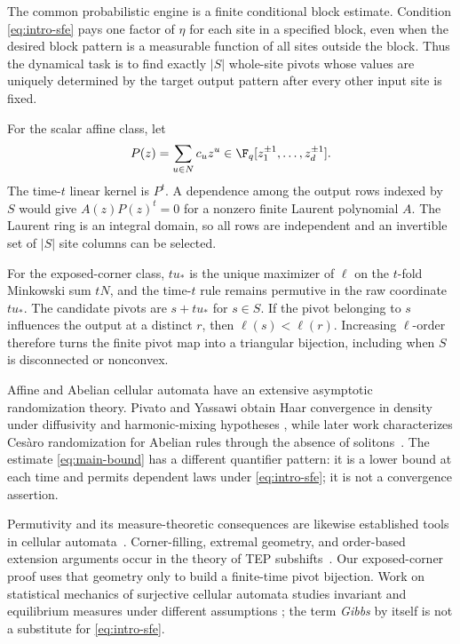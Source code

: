 The common probabilistic engine is a finite conditional block estimate.
Condition \eqref{eq:intro-sfe} pays one factor of $\eta$ for each site in a
specified block, even when the desired block pattern is a measurable
function of all sites outside the block.  Thus the dynamical task is to find
exactly $|S|$ whole-site pivots whose values are uniquely determined by the
target output pattern after every other input site is fixed.

For the scalar affine class, let
\[
  P(z)=\sum_{u\in N}c_u z^u
  \in\F_q[z_1^{\pm1},\ldots,z_d^{\pm1}].
\]
The time-$t$ linear kernel is $P^t$.  A dependence among the output rows
indexed by $S$ would give $A(z)P(z)^t=0$ for a nonzero finite Laurent
polynomial $A$.  The Laurent ring is an integral domain, so all rows are
independent and an invertible set of $|S|$ site columns can be selected.

For the exposed-corner class, $tu_*$ is the unique maximizer of $\ell$ on the
$t$-fold Minkowski sum $tN$, and the time-$t$ rule remains permutive in the
raw coordinate $tu_*$.  The candidate pivots are $s+tu_*$ for $s\in S$.
If the pivot belonging to $s$ influences the output at a distinct $r$, then
$\ell(s)<\ell(r)$.  Increasing $\ell$-order therefore turns the finite
pivot map into a triangular bijection, including when $S$ is disconnected or
nonconvex.

\FloatBarrier

\FloatBarrier

Affine and Abelian cellular automata have an extensive asymptotic
randomization theory.  Pivato and Yassawi obtain Haar convergence in density
under diffusivity and harmonic-mixing hypotheses
\cite[Theorem~12 and Proposition~14]{pivatoYassawi2002limit}
\cite[Theorem~3, Proposition~12, and Theorem~15]{pivatoYassawi2004limitII},
while later work
characterizes Ces\`aro randomization for Abelian rules through the absence of
solitons~\cite[Theorem~2]{hellouinSaloTheyssier2020randomization}.  The estimate
\eqref{eq:main-bound} has a different quantifier pattern: it is a lower bound
at each time and permits dependent laws under \eqref{eq:intro-sfe}; it is not
a convergence assertion.

Permutivity and its measure-theoretic consequences are likewise established
tools in cellular automata~\cite{pivato2005bipermutative}.  Corner-filling,
extremal geometry, and order-based extension arguments occur in the theory of
TEP subshifts~\cite[Theorems~1, 19, and 20]{salo2022cutting}.  Our
exposed-corner proof uses that
geometry only to build a finite-time pivot bijection.  Work on statistical
mechanics of surjective cellular automata studies invariant and equilibrium
measures under different assumptions
\cite[Corollary~21 and Theorem~41]{kariTaati2015statistical}; the
term \emph{Gibbs} by itself is not a substitute for
\eqref{eq:intro-sfe}.

